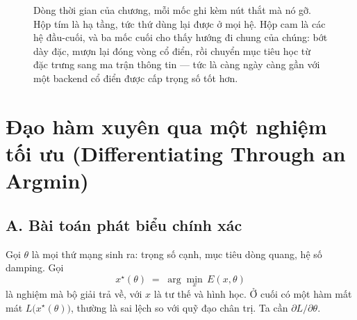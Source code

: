 \documentclass[../../deep_learning.tex]{subfiles}
\begin{document}
\begin{figure}[H]
{}
\caption{Dòng thời gian của chương, mỗi mốc ghi kèm nút thắt mà nó gỡ. Hộp tím là hạ tầng, tức thứ dùng lại được ở mọi hệ. Hộp cam là các hệ đầu-cuối, và ba mốc cuối cho thấy hướng đi chung của chúng: bớt dày đặc, mượn lại đóng vòng cổ điển, rồi chuyển mục tiêu học từ đặc trưng sang ma trận thông tin --- tức là càng ngày càng gần với một backend cổ điển được cấp trọng số tốt hơn.}
\label{fig:f31-dong-thoi-gian}
\end{figure}

\section{Đạo hàm xuyên qua một nghiệm tối ưu (Differentiating Through an Argmin)}

\subsection{A. Bài toán phát biểu chính xác}
Gọi \(\theta\) là mọi thứ mạng sinh ra: trọng số cạnh, mục tiêu dòng quang, hệ số damping. Gọi
\[
x^\star(\theta) \;=\; \arg\min_x\, E(x,\theta)
\]
là nghiệm mà bộ giải trả về, với \(x\) là tư thế và hình học. Ở cuối có một hàm mất mát \(L\big(x^\star(\theta)\big)\), thường là sai lệch so với quỹ đạo chân trị. Ta cần \(\partial L/\partial\theta\).
\end{document}

